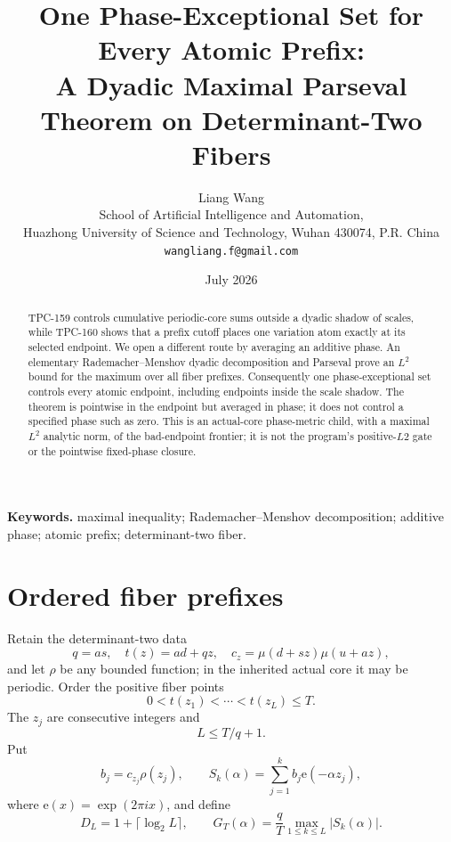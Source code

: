 \documentclass[11pt]{article}
\title{\textbf{One Phase-Exceptional Set for Every Atomic Prefix:\\
A Dyadic Maximal Parseval Theorem on Determinant-Two Fibers}}
\author{Liang Wang\\
\small School of Artificial Intelligence and Automation,\\[-2pt]
\small Huazhong University of Science and Technology, Wuhan 430074, P.R. China\\
\small \texttt{wangliang.f@gmail.com}}
\date{July 2026}
\theoremstyle{definition}
\newcommand{\e}{\mathrm e}
\begin{document}
\maketitle

\begin{abstract}
TPC-159 controls cumulative periodic-core sums outside a dyadic
shadow of scales, while TPC-160 shows that a prefix cutoff places one
variation atom exactly at its selected endpoint.  We open a different
route by averaging an additive phase.  An elementary
Rademacher--Menshov dyadic decomposition and Parseval prove an
\(L^2\) bound for the maximum over all fiber prefixes.  Consequently
one phase-exceptional set controls every atomic endpoint, including
endpoints inside the scale shadow.  The theorem is pointwise in the
endpoint but averaged in phase; it does not control a specified phase
such as zero.  This is an actual-core phase-metric child, with a
maximal \(L^2\) analytic norm, of the bad-endpoint frontier; it is
not the program's positive-\(L2\) gate or the pointwise fixed-phase
closure.
\end{abstract}

\noindent\textbf{Keywords.}
maximal inequality; Rademacher--Menshov decomposition; additive
phase; atomic prefix; determinant-two fiber.

\medskip
\noindent{}

\section{Ordered fiber prefixes}

Retain the determinant-two data
\[
 q=as,\quad t(z)=ad+qz,\quad
 c_z=\mu(d+sz)\mu(u+az),
\]
and let \(\rho\) be any bounded function; in the inherited actual
core it may be periodic.  Order the positive fiber points
\[
 0<t(z_1)<\cdots<t(z_L)\le T.
\]
The \(z_j\) are consecutive integers and
\begin{equation}
 L\le T/q+1.
\label{eq:count}
\end{equation}
Put
\[
 b_j=c_{z_j}\rho(z_j),\qquad
 S_k(\alpha)=\sum_{j=1}^kb_j\e(-\alpha z_j),
\]
where \(\e(x)=\exp(2\pi ix)\), and define
\[
 D_L=1+\lceil\log_2L\rceil,\qquad
 G_T(\alpha)=\frac qT\max_{1\le k\le L}|S_k(\alpha)|.
\]
\end{document}
